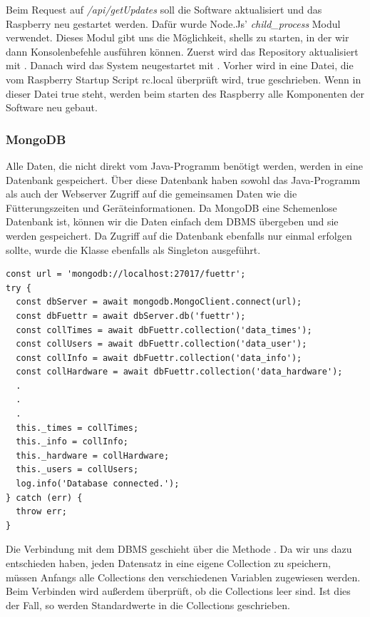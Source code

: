 Beim Request auf \textit{/api/getUpdates} soll die Software aktualisiert und das Raspberry neu gestartet werden. Dafür wurde Node.Js' \textit{child\_process} Modul verwendet. Dieses Modul gibt uns die Möglichkeit, shells zu starten, in der wir dann Konsolenbefehle ausführen können. Zuerst wird das Repository aktualisiert mit . Danach wird das System neugestartet mit . Vorher wird in eine Datei, die vom Raspberry Startup Script rc.local überprüft wird, true geschrieben. Wenn in dieser Datei true steht, werden beim starten des Raspberry alle Komponenten der Software neu gebaut.

\subsubsection{MongoDB}
\label{sec:ums-server-mongo}
Alle Daten, die nicht direkt vom Java-Programm benötigt werden, werden in eine Datenbank gespeichert. Über diese Datenbank haben sowohl das Java-Programm als auch der Webserver Zugriff auf die gemeinsamen Daten wie die Fütterungszeiten und Geräteinformationen. Da MongoDB eine Schemenlose Datenbank ist, können wir die Daten einfach dem \ac{DBMS} übergeben und sie werden gespeichert. Da Zugriff auf die Datenbank ebenfalls nur einmal erfolgen sollte, wurde die Klasse ebenfalls als Singleton ausgeführt. 

\begin{lstlisting}[caption=Verbindung mit der Datenbank,style=TS,label=database-connection]
const url = 'mongodb://localhost:27017/fuettr';
try {
  const dbServer = await mongodb.MongoClient.connect(url);
  const dbFuettr = await dbServer.db('fuettr');
  const collTimes = await dbFuettr.collection('data_times');
  const collUsers = await dbFuettr.collection('data_user');
  const collInfo = await dbFuettr.collection('data_info');
  const collHardware = await dbFuettr.collection('data_hardware');
  .
  .
  .
  this._times = collTimes;
  this._info = collInfo;
  this._hardware = collHardware;
  this._users = collUsers;
  log.info('Database connected.');
} catch (err) {
  throw err;
}
\end{lstlisting}

Die Verbindung mit dem \ac{DBMS} geschieht über die Methode . Da wir uns dazu entschieden haben, jeden Datensatz in eine eigene Collection zu speichern, müssen Anfangs alle Collections den verschiedenen Variablen zugewiesen werden. Beim Verbinden wird außerdem überprüft, ob die Collections leer sind. Ist dies der Fall, so werden Standardwerte in die Collections geschrieben. \\\\

